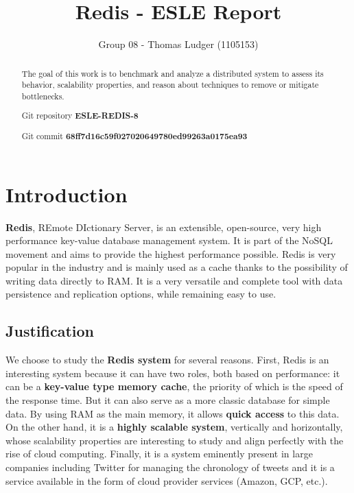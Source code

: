 \documentclass[runningheads]{llncs}
\begin{document}
\title{Redis - ESLE Report}
\author{Group 08 - Thomas Ludger (1105153)}
\maketitle
\begin{abstract}
The goal of this work is to benchmark and analyze a distributed system to assess its behavior, scalability properties, and reason about techniques to remove or mitigate bottlenecks.

Git repository \textbf{ESLE-REDIS-8}

Git commit \textbf{68ff7d16c59f027020649780ed99263a0175ea93}

\end{abstract}

\section{Introduction}
\textbf{Redis}, REmote DIctionary Server, is an extensible, open-source, very high performance key-value database management system. It is part of the NoSQL movement and aims to provide the highest performance possible. Redis is very popular in the industry and is mainly used as a cache thanks to the possibility of writing data directly to RAM. It is a very versatile and complete tool with data persistence and replication options, while remaining easy to use.

\subsection{Justification}
We choose to study the \textbf{Redis system} for several reasons. First, Redis is an interesting system because it can have two roles, both based on performance: it can be a \textbf{key-value type memory cache}, the priority of which is the speed of the response time. But it can also serve as a more classic database for simple data. By using RAM as the main memory, it allows \textbf{quick access} to this data.
On the other hand, it is a \textbf{highly scalable system}, vertically and horizontally, whose scalability properties are interesting to study and align perfectly with the rise of cloud computing.
Finally, it is a system eminently present in large companies including Twitter for managing the chronology of tweets and it is a service available in the form of cloud provider services (Amazon, GCP, etc.).
\end{document}
